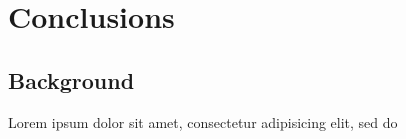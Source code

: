 \chapter{Conclusions}

\section{Background}

Lorem ipsum dolor sit amet, consectetur adipisicing elit, sed do


